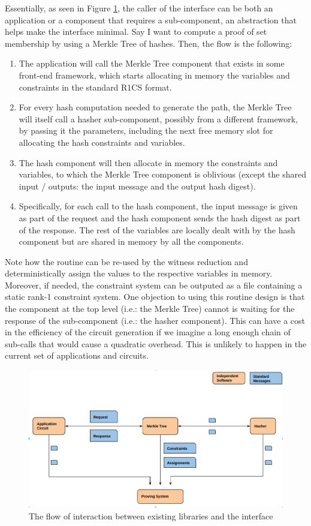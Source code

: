         Essentially, as seen in Figure \ref{flow}, the caller of the interface can be both an application or a component that requires a sub-component, an abstraction that helps make the interface minimal. Say I want to compute a proof of set membership by using a Merkle Tree of hashes. Then, the flow is the following:
        \begin{enumerate} 
            \item The application will call the Merkle Tree component that exists in some front-end framework, which starts allocating in memory the variables and constraints in the standard R1CS format.
            \item For every hash computation needed to generate the path, the Merkle Tree will itself call a hasher sub-component, possibly from a different framework, by passing it the parameters, including the next free memory slot for allocating the hash constraints and variables.
            \item The hash component will then allocate in memory the constraints and variables, to which the Merkle Tree component is oblivious (except the shared input / outputs: the input message and the output hash digest).
            \item Specifically, for each call to the hash component, the input message is given as part of the request and the hash component sends the hash digest as part of the response. The rest of the variables are locally dealt with by the hash component but are shared in memory by all the components.
        \end{enumerate}
        
        Note how the routine can be re-used by the witness reduction and deterministically assign the values to the respective variables in memory. Moreover, if needed, the constraint system can be outputed as a file containing a static rank-1 constraint system. One objection to using this routine design is that the component at the top level (i.e.: the Merkle Tree) cannot is waiting for the response of the sub-component (i.e.: the hasher component). This can have a cost in the efficiency of the circuit generation if we imagine a long enough chain of sub-calls that would cause a quadratic overhead. This is unlikely to happen in the current set of applications and circuits. 
		
			\begin{figure}[h!]
				\includegraphics[width=\linewidth]{routine.png}
				\caption{The flow of interaction between existing libraries and the interface}
				\label{flow}
			\end{figure}